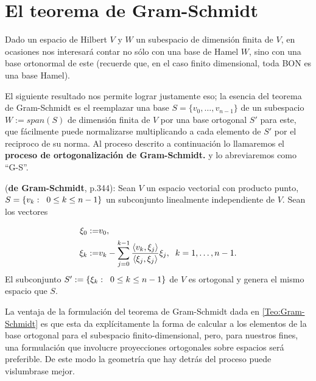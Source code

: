 \section{El teorema de Gram-Schmidt}
\label{ap: gram schmidt}
Dado un espacio de Hilbert $V$
y $W$ un subespacio de dimensión finita de $V$,
en ocasiones nos interesará contar no sólo con una
base de Hamel $W$, sino con una base ortonormal de este
(recuerde que, en el caso finito dimensional, toda
BON es una base Hamel).
 
El siguiente resultado nos permite lograr justamente eso;
la esencia del teorema de Gram-Schmidt es el reemplazar una base
$S=\{ v_{0}, \ldots ,v_{n-1} \}$ de un subespacio 
$W := span(S)$ de dimensión finita de $V$ 
por una base ortogonal $S'$ para este, que
fácilmente puede normalizarse multiplicando a cada elemento 
de $S'$ por el reciproco de su norma.
Al proceso descrito a continuación lo llamaremos
el \textbf{proceso de ortogonalización de Gram-Schmidt.}
y lo abreviaremos como ``G-S''.\\

\begin{teo} \label{Teo:Gram-Schmidt}
(\textbf{de Gram-Schmidt}, \cite{friedberg} p.344): 
Sean $V$ un espacio vectorial
con producto punto, $S=\{ v_{k} : \hspace{0.2cm} 0 \leq k \leq n-1 \}$ un
subconjunto linealmente independiente de $V$. 
Sean los vectores

\[
\begin{split}
\xi_{0}:= & v_{0}, \\
\xi_{k} := & v_{k} - \sum\limits_{j=0}^{k-1}
\frac{\langle v_{k} , \xi_{j} \rangle}{
\langle \xi_{j} , \xi_{j} \rangle}  \xi_{j},
\hspace{0.2cm} k=1, \ldots ,n-1.
\end{split}
\]
\noindent
El subconjunto 
$S':=\{ \xi_{k} : \hspace{0.2cm} 0 \leq k \leq n-1  \}$ de $V$
es ortogonal y genera 
el mismo espacio que $S$.
\end{teo}


La ventaja de la formulación del teorema
de Gram-Schmidt dada en \ref{Teo:Gram-Schmidt}
es que esta
da explícitamente la forma de calcular a los
elementos de la base ortogonal para el subespacio
finito-dimensional, pero,
para nuestros fines, una formulación que
involucre proyecciones ortogonales sobre espacios
será preferible. De este modo la geometría
que hay detrás del proceso puede
vislumbrase mejor. 


